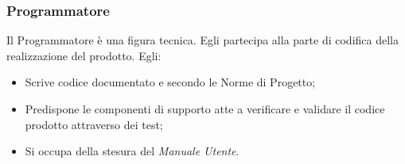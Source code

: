                 \subsubsection{Programmatore}
                    Il Programmatore è una figura tecnica. Egli partecipa alla parte di codifica della realizzazione del prodotto. Egli:
                    \begin{itemize}
                        \item Scrive codice documentato e secondo le Norme di Progetto;
                        \item Predispone le componenti di supporto atte a verificare e validare il codice prodotto attraverso dei test;
                        \item Si occupa della stesura del \textit{Manuale Utente}.
                    \end{itemize}
